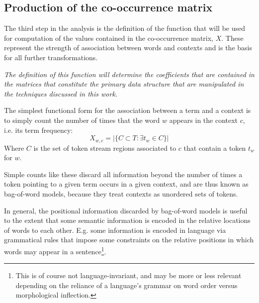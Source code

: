 \subsection{Production of the co-occurrence matrix}
\label{subsec:cooc}

The third step in the analysis is the definition of the function that will be used for computation of the values contained in the co-occurrence matrix, $X$.
These represent the strength of association between words and contexts and is the basis for all further transformations.

\emph{
    The definition of this function will determine the coefficients that are contained in the matrices that constitute the primary data structure that are manipulated in the techniques discussed in this work.
}

The simplest functional form for the association between a term and a context is to simply count the number of times that the word $w$ appears in the context $c$, i.e. its term frequency:
\[
    X_{w,c} = | \{ C \subset T : \exists t_w \in C \} |
\]
Where $C$ is the set of token stream regions associated to $c$ that contain a token $t_w$ for $w$.

Simple counts like these discard all information beyond the number of times a token pointing to a given term occurs in a given context, and are thus known as bag-of-word models, because they treat contexts as unordered sets of tokens.

In general, the positional information discarded by bag-of-word models is useful to the extent that some semantic information is encoded in the relative locations of words to each other.
E.g. some information is encoded in language via grammatical rules that impose some constraints on the relative positions in which words may appear in a sentence\footnote{
    This is of course not language-invariant, and may be more or less relevant depending on the reliance of a language's grammar on word order versus morphological inflection.
}.

